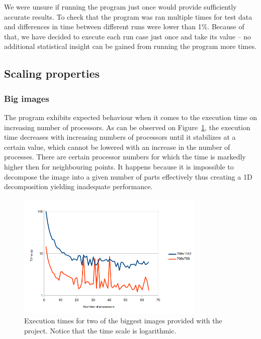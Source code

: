 \documentclass[11pt,a4paper]{article}
\begin{document}
We were unsure if running the program just once would provide sufficiently accurate results.
To check that the program was ran multiple times for test data and differences in time between different runs were lower than 1\%.
Because of that, we have decided to execute each run case just once and take its value -- no additional statistical insight can be gained from running the program more times.

\subsection{Scaling properties}
\subsubsection{Big images}
The program exhibits expected behaviour when it comes to the execution time on increasing number of processors.
As can be observed on Figure~\ref{fig:big}, the execution time decreases with increasing numbers of processors until it stabilizes at a certain value, which cannot be lowered with an increase in the number of processes.
There are certain processor numbers for which the time is markedly higher then for neighbouring points.
It happens because it is impossible to decompose the image into a given number of parts effectively thus creating a 1D decomposition yielding inadequate performance.

\begin{figure}[h!]
    \begin{center}
        \includegraphics[width=0.8\textwidth]{big_time.png}
    \end{center}
    \caption{Execution times for two of the biggest images provided with the project. Notice that the time scale is logarithmic.}\label{fig:big}
\end{figure}
\end{document}
